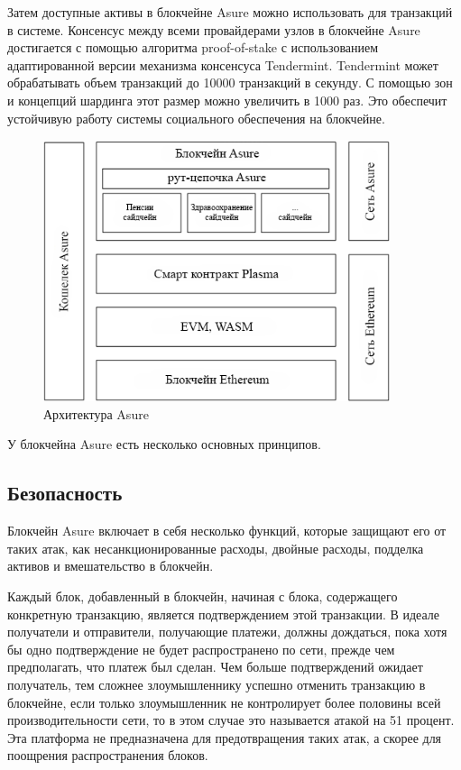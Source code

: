 Затем доступные активы в блокчейне Asure можно использовать для транзакций в системе. Консенсус между всеми провайдерами узлов в блокчейне Asure достигается с помощью алгоритма proof-of-stake с использованием адаптированной версии механизма консенсуса Tendermint. \cite{tendermint} Tendermint может обрабатывать объем транзакций до 10000 транзакций в секунду. С помощью зон и концепций шардинга этот размер можно увеличить в 1000 раз. Это обеспечит устойчивую работу системы социального обеспечения на блокчейне. \cite{tendermint_bench}

\begin{figure}[H]
    \centering
    \includegraphics[width=4.0in]{img/architecture.png}
    \caption{Архитектура Asure}
    \label{fig:asure_architecture}
\end{figure}

У блокчейна Asure есть несколько основных принципов. 

\subsection{Безопасность}
Блокчейн Asure включает в себя несколько функций, которые защищают его от таких атак, как несанкционированные расходы, двойные расходы, подделка активов и вмешательство в блокчейн. 

Каждый блок, добавленный в блокчейн, начиная с блока, содержащего конкретную транзакцию, является подтверждением этой транзакции. В идеале получатели и отправители, получающие платежи, должны дождаться, пока хотя бы одно подтверждение не будет распространено по сети, прежде чем предполагать, что платеж был сделан. Чем больше подтверждений ожидает получатель, тем сложнее злоумышленнику успешно отменить транзакцию в блокчейне, если только злоумышленник не контролирует более половины всей производительности сети, то в этом случае это называется атакой на 51 процент. Эта платформа не предназначена для предотвращения таких атак, а скорее для поощрения распространения блоков. 

